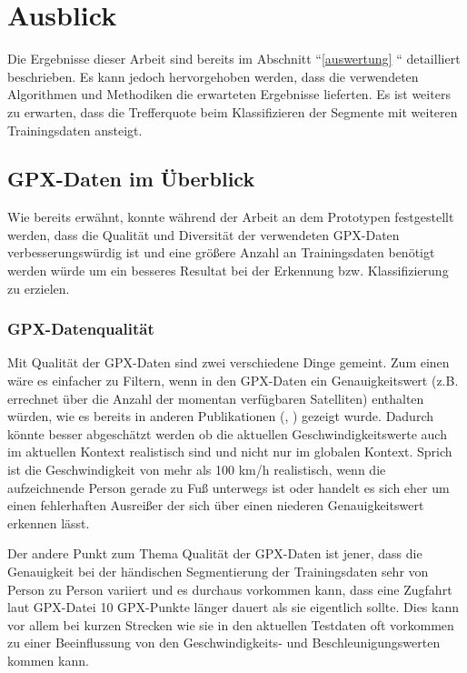 \chapter{Ausblick}
Die Ergebnisse dieser Arbeit sind bereits im Abschnitt ``\ref{auswertung} `` detailliert beschrieben. Es kann jedoch hervorgehoben werden, dass die verwendeten Algorithmen und Methodiken die erwarteten Ergebnisse lieferten. Es ist weiters zu erwarten, dass die Trefferquote beim Klassifizieren der Segmente mit weiteren Trainingsdaten ansteigt. 

\section{GPX-Daten im Überblick}
Wie bereits erwähnt, konnte während der Arbeit an dem Prototypen festgestellt werden, dass die Qualität und Diversität der verwendeten GPX-Daten verbesserungswürdig ist und eine größere Anzahl an Trainingsdaten benötigt werden würde um ein besseres Resultat bei der Erkennung bzw. Klassifizierung zu erzielen. 

\subsection{GPX-Datenqualität}
Mit Qualität der GPX-Daten sind zwei verschiedene Dinge gemeint. Zum einen wäre es einfacher zu Filtern, wenn in den GPX-Daten ein Genauigkeitswert (z.B. errechnet über die Anzahl der momentan verfügbaren Satelliten) enthalten würden, wie es bereits in anderen Publikationen (\cite{stenneth_transportation_2011}, \cite{nadine_schussler_improving_2011}) gezeigt wurde. Dadurch könnte besser abgeschätzt werden ob die aktuellen Geschwindigkeitswerte auch im aktuellen Kontext realistisch sind und nicht nur im globalen Kontext. Sprich ist die Geschwindigkeit von mehr als 100 km/h realistisch, wenn die aufzeichnende Person gerade zu Fuß unterwegs ist oder handelt es sich eher um einen fehlerhaften Ausreißer der sich über einen niederen Genauigkeitswert erkennen lässt.

Der andere Punkt zum Thema Qualität der GPX-Daten ist jener, dass die Genauigkeit bei der händischen Segmentierung der Trainingsdaten sehr von Person zu Person variiert und es durchaus vorkommen kann, dass eine Zugfahrt laut GPX-Datei 10 GPX-Punkte länger dauert als sie eigentlich sollte. Dies kann vor allem bei kurzen Strecken wie sie in den aktuellen Testdaten oft vorkommen zu einer Beeinflussung von den Geschwindigkeits- und Beschleunigungswerten kommen kann. 

